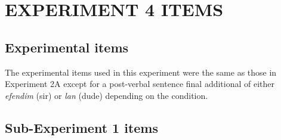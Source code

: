 


\chapter{EXPERIMENT 4 ITEMS} \label{ap:exp4items}

\section{Experimental items}

The experimental items used in this experiment were the same as those in Experiment 2A except for a post-verbal sentence final additional of either \emph{efendim} (sir) or \emph{lan} (dude) depending on the condition. 

\section{Sub-Experiment 1 items}

